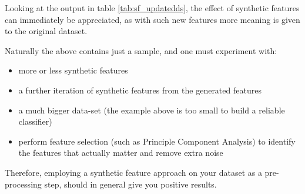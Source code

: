 \begin{table}[ht]
    \centering
    \selectfont
    \caption{Updated sample of the four rows from the Psy dataset from the YouTube comment training dataset now containg the synthetic features.}
    \label{tab:sf_updatedds}
\end{table}
\vspace{2mm}

Looking at the output in table \ref{tab:sf_updatedds}, the effect of synthetic features can immediately be appreciated, as with such new features more meaning is given to the original dataset.

Naturally the above contains just a sample, and one must experiment with:

\begin{itemize}
    \item more or less synthetic features
    \item a further iteration of synthetic features from the generated features
    \item a much bigger data-set (the example above is too small to build a reliable classifier)
    \item perform feature selection (such as Principle Component Analysis) to identify the features that actually matter and remove extra noise
\end{itemize}

Therefore, employing a synthetic feature approach on your dataset as a pre-processing step, should in general give you positive results.